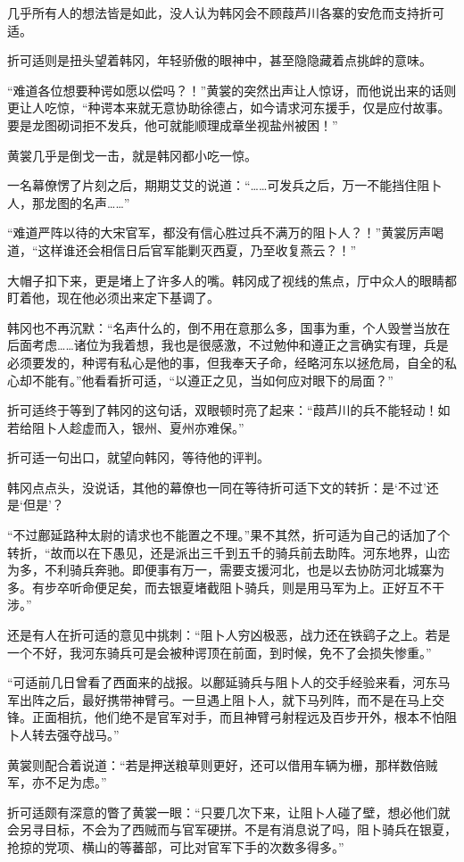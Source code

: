 几乎所有人的想法皆是如此，没人认为韩冈会不顾葭芦川各寨的安危而支持折可适。

折可适则是扭头望着韩冈，年轻骄傲的眼神中，甚至隐隐藏着点挑衅的意味。

“难道各位想要种谔如愿以偿吗？！”黄裳的突然出声让人惊讶，而他说出来的话则更让人吃惊，“种谔本来就无意协助徐德占，如今请求河东援手，仅是应付故事。要是龙图砌词拒不发兵，他可就能顺理成章坐视盐州被困！”

黄裳几乎是倒戈一击，就是韩冈都小吃一惊。

一名幕僚愣了片刻之后，期期艾艾的说道：“……可发兵之后，万一不能挡住阻卜人，那龙图的名声……”

“难道严阵以待的大宋官军，都没有信心胜过兵不满万的阻卜人？！”黄裳厉声喝道，“这样谁还会相信日后官军能剿灭西夏，乃至收复燕云？！”

大帽子扣下来，更是堵上了许多人的嘴。韩冈成了视线的焦点，厅中众人的眼睛都盯着他，现在他必须出来定下基调了。

韩冈也不再沉默：“名声什么的，倒不用在意那么多，国事为重，个人毁誉当放在后面考虑……诸位为我着想，我也是很感激，不过勉仲和遵正之言确实有理，兵是必须要发的，种谔有私心是他的事，但我奉天子命，经略河东以拯危局，自全的私心却不能有。”他看看折可适，“以遵正之见，当如何应对眼下的局面？”

折可适终于等到了韩冈的这句话，双眼顿时亮了起来：“葭芦川的兵不能轻动！如若给阻卜人趁虚而入，银州、夏州亦难保。”

折可适一句出口，就望向韩冈，等待他的评判。

韩冈点点头，没说话，其他的幕僚也一同在等待折可适下文的转折：是‘不过’还是‘但是’？

“不过鄜延路种太尉的请求也不能置之不理。”果不其然，折可适为自己的话加了个转折，“故而以在下愚见，还是派出三千到五千的骑兵前去助阵。河东地界，山峦为多，不利骑兵奔驰。即便事有万一，需要支援河北，也是以去协防河北城寨为多。有步卒听命便足矣，而去银夏堵截阻卜骑兵，则是用马军为上。正好互不干涉。”

还是有人在折可适的意见中挑刺：“阻卜人穷凶极恶，战力还在铁鹞子之上。若是一个不好，我河东骑兵可是会被种谔顶在前面，到时候，免不了会损失惨重。”

“可适前几日曾看了西面来的战报。以鄜延骑兵与阻卜人的交手经验来看，河东马军出阵之后，最好携带神臂弓。一旦遇上阻卜人，就下马列阵，而不是在马上交锋。正面相抗，他们绝不是官军对手，而且神臂弓射程远及百步开外，根本不怕阻卜人转去强夺战马。”

黄裳则配合着说道：“若是押送粮草则更好，还可以借用车辆为栅，那样数倍贼军，亦不足为虑。”

折可适颇有深意的瞥了黄裳一眼：“只要几次下来，让阻卜人碰了壁，想必他们就会另寻目标，不会为了西贼而与官军硬拼。不是有消息说了吗，阻卜骑兵在银夏，抢掠的党项、横山的等蕃部，可比对官军下手的次数多得多。”

